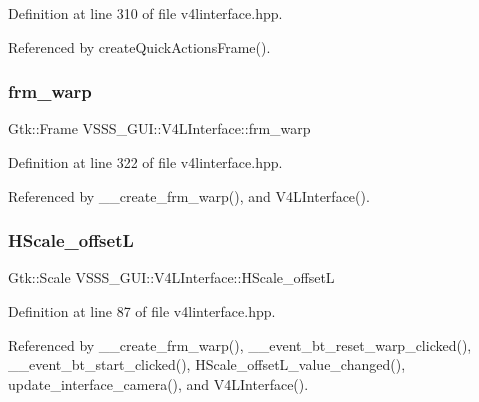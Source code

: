 Definition at line 310 of file v4linterface.\+hpp.



Referenced by create\+Quick\+Actions\+Frame().

\mbox{\label{class_v_s_s_s___g_u_i_1_1_v4_l_interface_af5db2099d80d5ef2fcc1d97417e6ce72}} 
\subsubsection{\texorpdfstring{frm\+\_\+warp}{frm\_warp}}
{\footnotesize\ttfamily Gtk\+::\+Frame V\+S\+S\+S\+\_\+\+G\+U\+I\+::\+V4\+L\+Interface\+::frm\+\_\+warp\hspace{0.3cm}{\ttfamily [private]}}



Definition at line 322 of file v4linterface.\+hpp.



Referenced by \+\_\+\+\_\+create\+\_\+frm\+\_\+warp(), and V4\+L\+Interface().

\mbox{\label{class_v_s_s_s___g_u_i_1_1_v4_l_interface_a7261b87cb8ad1293c79003c48c99558a}} 
\subsubsection{\texorpdfstring{H\+Scale\+\_\+offsetL}{HScale\_offsetL}}
{\footnotesize\ttfamily Gtk\+::\+Scale V\+S\+S\+S\+\_\+\+G\+U\+I\+::\+V4\+L\+Interface\+::\+H\+Scale\+\_\+offsetL}



Definition at line 87 of file v4linterface.\+hpp.



Referenced by \+\_\+\+\_\+create\+\_\+frm\+\_\+warp(), \+\_\+\+\_\+event\+\_\+bt\+\_\+reset\+\_\+warp\+\_\+clicked(), \+\_\+\+\_\+event\+\_\+bt\+\_\+start\+\_\+clicked(), H\+Scale\+\_\+offset\+L\+\_\+value\+\_\+changed(), update\+\_\+interface\+\_\+camera(), and V4\+L\+Interface().

